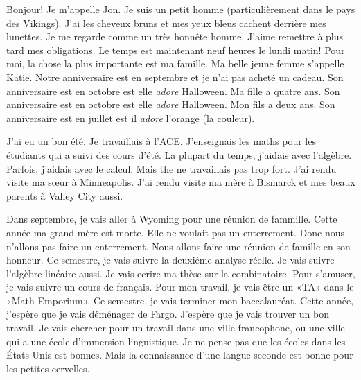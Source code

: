 \documentclass[letterpaper]{article}
\begin{document}
\doublespacing
Bonjour! Je m'appelle Jon.
Je suis un petit homme (particulièrement dans le pays des Vikings).
J'ai les cheveux bruns et mes yeux bleus cachent derrière mes lunettes.
Je me regarde comme un très honnête homme.
J'aime remettre à plus tard mes obligations.
Le temps est maintenant neuf heures le lundi matin! Pour moi, la chose la plus importante est ma famille.
Ma belle jeune femme s'appelle Katie.
Notre anniversaire est en septembre et je n'ai pas acheté un cadeau.
Son anniversaire est en octobre est elle \emph{adore} Halloween.
Ma fille a quatre ans.
Son anniversaire est en octobre est elle \emph{adore} Halloween.
Mon fils a deux ans.
Son anniversaire est en juillet est il \emph{adore} l'orange (la couleur).

J'ai eu un bon été.
Je travaillais à l'ACE.
J'enseignais les maths pour les étudiants qui a suivi des cours d'été.
La plupart du temps, j'aidais avec l'algèbre. Parfois, j'aidais avec le calcul.
Mais the ne travaillais pas trop fort.
J'ai rendu visite ma sœur à Minneapolis.
J'ai rendu visite ma mère à Bismarck et mes beaux parents à Valley City aussi. 

Dans septembre, je vais aller à Wyoming pour une réunion de fammille.
Cette année ma grand-mère est morte.
Elle ne voulait pas un enterrement.
Donc nous n'allons pas faire un enterrement.
Nous allons faire une réunion de famille en son honneur.
Ce semestre, je vais suivre la deuxiéme analyse réelle.
Je vais suivre l'algèbre linéaire aussi.
Je vais ecrire ma thèse sur la combinatoire.
Pour s'amuser, je vais suivre un cours de français.
Pour mon travail, je vais être un «TA» dans le «Math Emporium».
Ce semestre, je vais terminer mon baccalauréat. Cette année, j'espère que je vais déménager de Fargo. J'espère que je vais trouver un bon travail. Je vais chercher pour un travail dans une ville francophone, ou une ville qui a une école d'immersion linguistique. Je ne pense pas que les écoles dans les États Unis est bonnes. Mais la connaissance d'une langue seconde est bonne pour les petites cervelles.
\end{document}
